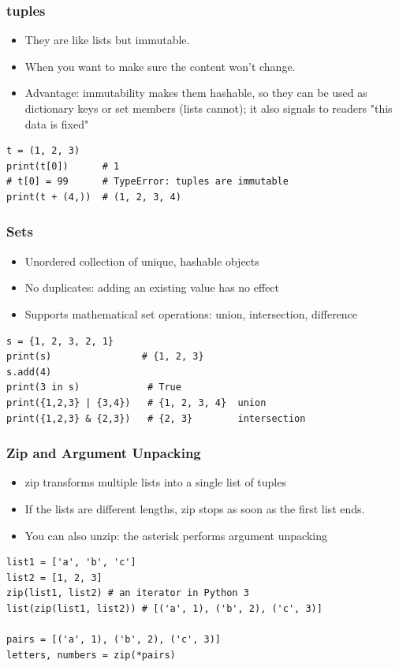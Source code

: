 \begin{frame}[fragile]\frametitle{tuples}
  \begin{itemize}
  \item They are like lists but immutable.
  \item When you want to make sure the content won't change.
  \item Advantage: immutability makes them hashable, so they can be used as dictionary keys or set members (lists cannot); it also signals to readers "this data is fixed"
  \end{itemize}
  \begin{lstlisting}
t = (1, 2, 3)
print(t[0])      # 1
# t[0] = 99      # TypeError: tuples are immutable
print(t + (4,))  # (1, 2, 3, 4)
  \end{lstlisting}
\end{frame}

\begin{frame}[fragile]\frametitle{Sets}
  \begin{itemize}
  \item Unordered collection of unique, hashable objects
  \item No duplicates: adding an existing value has no effect
  \item Supports mathematical set operations: union, intersection, difference
  \end{itemize}
  \begin{lstlisting}
s = {1, 2, 3, 2, 1}
print(s)                # {1, 2, 3}
s.add(4)
print(3 in s)            # True
print({1,2,3} | {3,4})   # {1, 2, 3, 4}  union
print({1,2,3} & {2,3})   # {2, 3}        intersection
  \end{lstlisting}
\end{frame}


\begin{frame}[fragile]\frametitle{Zip and Argument Unpacking}
  \begin{itemize}
  \item zip transforms multiple lists into a single list of tuples
  \item If the	lists are different lengths, zip stops as soon as the first list ends.
  \item You can also unzip: the asterisk performs argument unpacking
  \end{itemize}
  \begin{lstlisting}
list1 = ['a', 'b', 'c']
list2 = [1, 2, 3]
zip(list1, list2) # an iterator in Python 3
list(zip(list1, list2)) # [('a', 1), ('b', 2), ('c', 3)]

pairs = [('a', 1), ('b', 2), ('c', 3)]
letters, numbers = zip(*pairs)
  \end{lstlisting}
\end{frame}

